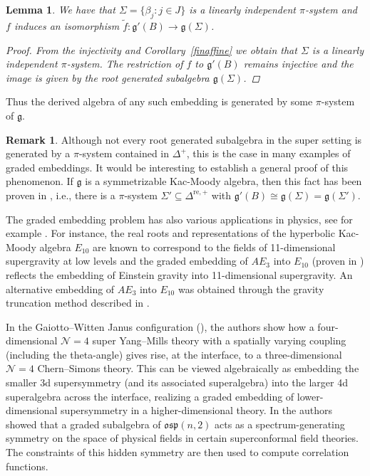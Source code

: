 \documentclass[11pt,reqno]{amsart}
\theoremstyle{plain}
\newtheorem*{lemma}{Lemma}
\theoremstyle{definition}
\newtheorem*{rem}{Remark}
\theoremstyle{remark}
\newcommand{\lie}[1]{\mathfrak{#1}}
\numberwithin{equation}{section}
\begin{document}
\begin{lemma}
We have that $\Sigma= \{\beta_j : j \in J\}$ is a linearly independent $\pi$-system and $f$ induces an isomorphism $\tilde{f}: \lie g'(B)\to \lie g(\Sigma)$.
    \begin{proof}
        From the injectivity and Corollary~\ref{finaffine} we obtain that $\Sigma$ is a linearly independent $\pi$-system. The restriction of $f$ to $\lie g'(B)$ remains injective and the image is given by the root generated subalgebra $\lie g(\Sigma)$.
    \end{proof}
\end{lemma}
Thus the derived algebra of any such embedding is generated by some $\pi$-system of $\lie g$. 
\begin{rem}
     Although not every root generated subalgebra in the super setting is generated by a $\pi$-system contained in $\Delta^+$, this is the case in many examples of graded embeddings. It would be interesting to establish a general proof of this phenomenon. If $\lie g$ is a symmetrizable Kac-Moody algebra, then this fact has been proven in \cite[Proposition 3.4]{idv2023root}, i.e., there is a $\pi$-system $\Sigma'\subseteq\Delta^{\mathrm{re},+}$ with  $\lie g'(B)\cong \lie g(\Sigma)=\lie g(\Sigma').$
\end{rem}
The graded embedding problem has also various applications in physics, see for example \cite{damour03cosmological, feingold83ahyperbolic, superspace81}. For instance, the real roots and representations of the hyperbolic Kac-Moody algebra $ E_{10} $ are known to correspond to the fields of 11-dimensional supergravity at low levels \cite{damour03cosmological} and the graded embedding of $AE_3$ into $E_{10}$ (proven in \cite{viswanath08embedding}) reflects the embedding of Einstein gravity into 11-dimensional supergravity. An alternative embedding of $AE_3$ into $ E_{10} $ was obtained through the gravity truncation method described in \cite{damour09fermionic}. 

In the Gaiotto--Witten Janus configuration (\cite{GaiottoWitten2010Janus}), the authors show how a four-dimensional $\mathcal{N}=4$ super Yang--Mills theory with a spatially varying coupling (including the theta-angle) gives rise, at the interface, to a three-dimensional  \(\mathcal{N}=4\) Chern--Simons theory. This can be viewed algebraically as embedding the smaller 3d supersymmetry (and its associated superalgebra) into the larger 4d superalgebra across the interface, realizing a graded embedding of lower-dimensional supersymmetry in a higher-dimensional theory. In \cite{BershadskyOoguri1989Hidden} the authors showed that a graded subalgebra of $\lie{osp}(n,2)$ acts as a spectrum-generating symmetry on the space of physical fields in certain superconformal field theories. The constraints of this hidden symmetry are then used to compute correlation functions.



\end{document}
